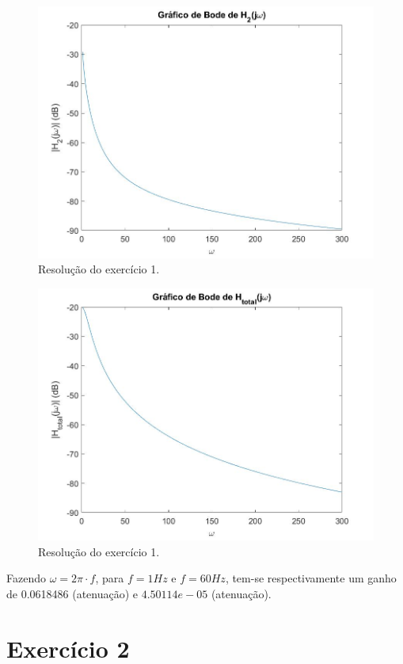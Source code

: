 \documentclass[a4paper,12pt,oneside,openany,table,xcdraw]{article}
\begin{document}
\begin{figure}[H]
\centering
\captionsetup{font=scriptsize}
\includegraphics[width=14.5cm]{Ex1_c2}
\caption{Resolução do exercício 1.}
\label{bode:h2:linear}
\end{figure}

\begin{figure}[H]
\centering
\captionsetup{font=scriptsize}
\includegraphics[width=14.5cm]{Ex1_ctot}
\caption{Resolução do exercício 1.}
\label{bode:htotal:linear}
\end{figure}

\vspace{1cm}
Fazendo $\omega=2\pi \cdot f$, para $f=1Hz$ e $f=60Hz$, tem-se respectivamente um ganho de 0.0618486 (atenuação) e $4.50114e-05$ (atenuação).

\vspace{1cm}

\section{Exercício 2}
\end{document}
